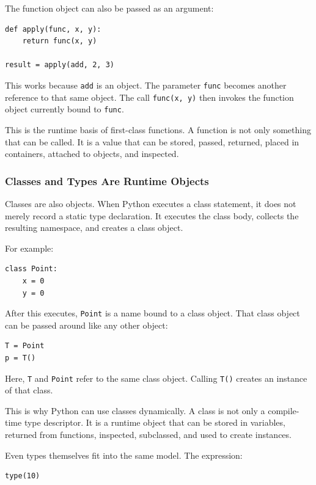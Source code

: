 The function object can also be passed as an argument:

\begin{verbatim}
def apply(func, x, y):
    return func(x, y)

result = apply(add, 2, 3)
\end{verbatim}

This works because \texttt{add} is an object. The parameter \texttt{func} becomes another reference to that same object. The call \texttt{func(x, y)} then invokes the function object currently bound to \texttt{func}.

This is the runtime basis of first-class functions. A function is not only something that can be called. It is a value that can be stored, passed, returned, placed in containers, attached to objects, and inspected.

\subsubsection*{Classes and Types Are Runtime Objects}

Classes are also objects. When Python executes a class statement, it does not merely record a static type declaration. It executes the class body, collects the resulting namespace, and creates a class object.

For example:

\begin{verbatim}
class Point:
    x = 0
    y = 0
\end{verbatim}

After this executes, \texttt{Point} is a name bound to a class object. That class object can be passed around like any other object:

\begin{verbatim}
T = Point
p = T()
\end{verbatim}

Here, \texttt{T} and \texttt{Point} refer to the same class object. Calling \texttt{T()} creates an instance of that class.

This is why Python can use classes dynamically. A class is not only a compile-time type descriptor. It is a runtime object that can be stored in variables, returned from functions, inspected, subclassed, and used to create instances.

Even types themselves fit into the same model. The expression:

\begin{verbatim}
type(10)
\end{verbatim}

